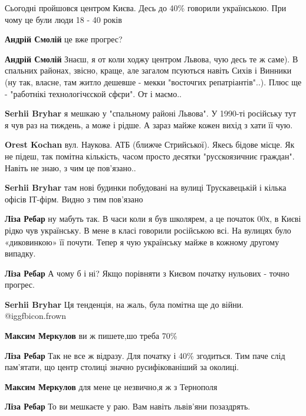 \begin{itemize}

Сьогодні пройшовся центром Києва. Десь до 40\% говорили українською. При чому
це були люди 18 - 40 років

\begin{itemize} %
\textbf{Андрій Смолій} це вже прогрес?

\textbf{Андрій Смолій} Знаєш, я от коли ходжу центром Львова, чую десь те ж саме). В спальних районах, звісно, краще, але загалом псуються навіть Сихів і Винники (ну так, власне, там житло дешевше - мекки "восточгих репатріантів"..). Плюс ще - "работнікі технологічєской сфєри". От і маємо..

\textbf{Serhii Bryhar} я мешкаю у "спальному районі Львова". У 1990-ті російську тут я чув раз на тиждень, а може і рідше. А зараз майже кожен вихід з хати її чую.

\textbf{Orest Kochan} вул. Наукова. АТБ (ближче Стрийської). Якесь бідове місце. Як не підеш, так помітна кількість, часом просто десятки "русскоязичниє граждан". Навіть не знаю, з чим це пов'язано..

\textbf{Serhii Bryhar} там нові будинки побудовані на вулиці Трускавецькій і кілька офісів ІТ-фірм. Видно з тим пов'язано


\textbf{Ліза Ребар} ну мабуть так. В часи коли я був школярем, а це початок 00х, в Києві рідко чув українську. В мене в класі говорили російською всі. На вулицях було «диковинкою» її почути. Тепер я чую українську майже в кожному другому випадку.

\textbf{Ліза Ребар} А чому б і ні? Якщо порівняти з Києвом початку нульових - точно прогрес.

\textbf{Serhii Bryhar} Ця тенденція, на жаль, була помітна ще до війни.  @igg{fbicon.frown} 

\textbf{Максим Меркулов} ви ж пишете,шо треба 70\%

\textbf{Ліза Ребар} Так не все ж відразу. Для початку і 40\% згодиться. Тим паче
слід пам'ятати, що центр столиці значно русифікованіший за околиці.

\textbf{Максим Меркулов} для мене це незвично,я ж з Тернополя

\textbf{Ліза Ребар} То ви мешкаєте у раю. Вам навіть львів'яни позаздрять.


\end{itemize}
\end{itemize}
